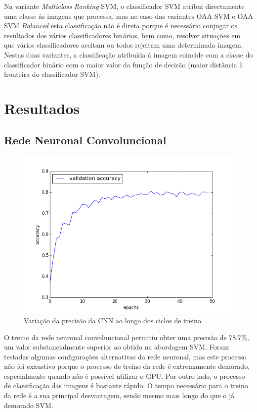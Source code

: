 \documentclass[extendedabs]{vcom}
\begin{document}
Na variante \textit{Multiclass Ranking} SVM, o classificador SVM atribui directamente uma classe às imagens que processa, mas no caso das variantes OAA SVM e OAA SVM \textit{Balanced} esta classificação não é direta porque é necessário conjugar os resultados dos vários classificadores binários, bem como, resolver situações em que vários classificadores aceitam ou todos rejeitam uma determinada imagem. Nestas duas variantes, a classificação atribuída à imagem coincide com a classe do classificador binário com o maior valor da função de decisão (maior distância à fronteira do classificador SVM).

\section{Resultados}

\subsection{Rede Neuronal Convoluncional}

\begin{figure}[h]
\includegraphics[width=\linewidth]{images/obj_rec_graph_50.png}
\caption{Variação da precisão da CNN ao longo dos ciclos de treino}
\label{fig:graph2}
\end{figure}

O treino da rede neuronal convoluncional permitiu obter uma precisão de 78.7\%, um valor substancialmente superior ao obtido na abordagem SVM. Foram testadas algumas configurações alternativas da rede neuronal, mas este processo não foi exaustivo porque o processo de treino da rede é extremamente demorado, especialmente quando não é possível utilizar o GPU. Por outro lado, o processo de classificação das imagens é bastante rápido. O tempo necessário para o treino da rede é a sua principal desvantagem, sendo mesmo mais longo do que o já demorado SVM.
\end{document}
